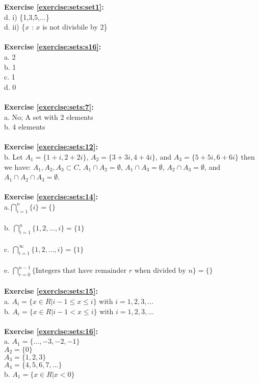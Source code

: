 \textbf{Exercise \ref{exercise:sets:set1}:}\\
d. i) \{1,3,5,...\}\\
d. ii) \{$x$ : $x$ is not divisbile by 2\}\\
\\
\textbf{Exercise \ref{exercise:sets:s16}:}\\
a. 2\\
b. 1\\
c. 1\\
d. 0\\
\\
\textbf{Exercise \ref{exercise:sets:7}:}\\
a. No; A set with 2 elements\\
b. 4 elements\\
\\
\textbf{Exercise \ref{exercise:sets:12}:}\\
b. Let $A_1=\{ 1+i,2+2i\}$, $A_2=\{ 3+3i,4+4i\}$, and $A_3=\{5+5i,6+6i\}$ then we have:
$A_1,A_2,A_3 \subset C$, $A_1 \cap A_2=\emptyset$, $A_1 \cap A_3=\emptyset$, $A_2 \cap A_3=\emptyset$, and $A_1 \cap A_2 \cap A_3=\emptyset$.\\
\\
\textbf{Exercise \ref{exercise:sets:14}:}\\
a.$\bigcap_{i = 1}^{n}  \{i\}=\{\}$\\
\\
b. $\bigcap^{n}_{i=1} \{ 1,2,...,i \}=\{1\}$\\
\\
c. $\bigcap^{\infty}_{i=1} \{ 1,2,...,i \}=\{1\}$\\
\\
e. $\bigcap_{r = 0}^{n-1}  \{\mbox{Integers that have remainder }r \mbox{ when divided by }n\}=\{\}$\\
\\
\textbf{Exercise \ref{exercise:sets:15}:}\\
a. $A_i=\{x\in R|i-1 \le x\le i\}$ with $i=1,2,3,...$\\
b. $A_i=\{x\in R|i-1 < x\le i\}$ with $i=1,2,3,...$\\
\\
\textbf{Exercise \ref{exercise:sets:16}:}\\
a. $A_1=\{...,-3,-2,-1\} $\\
$A_2=\{0\}$\\
$A_3=\{1,2,3\}$\\
$A_4=\{4,5,6,7,...\}$\\
b. $A_1=\{x\in R|x<0\}$\\
